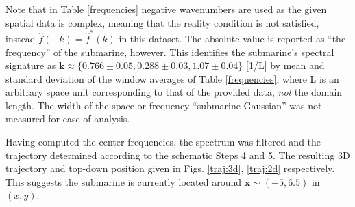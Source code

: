 \documentclass{article}
\begin{document}
Note that in Table \ref{frequencies} negative wavenumbers are used as the given spatial data is complex, meaning that the reality condition is not satisfied, instead $\hat{f}(-k) = \hat{f}^*(k)$ in this dataset. The absolute value is reported as ``the frequency'' of the submarine, however. This identifies the submarine's spectral signature as $\bm{k} \approx \{0.766 \pm 0.05, 0.288 \pm 0.03, 1.07 \pm 0.04 \}$ {[}1/L{]} by mean and standard deviation of the window averages of Table \ref{frequencies}, where L is an arbitrary space unit corresponding to that of the provided data, \textit{not} the domain length. The width of the space or frequency ``submarine Gaussian'' was not measured for ease of analysis.

Having computed the center frequencies, the spectrum was filtered and the trajectory determined according to the schematic Steps 4 and 5. The resulting 3D trajectory and top-down position given in Figs. \ref{traj:3d}, \ref{traj:2d} respectively. This suggests the submarine is currently located around $\bm{x}\sim(-5, 6.5)$ in $(x,y)$.
\end{document}
